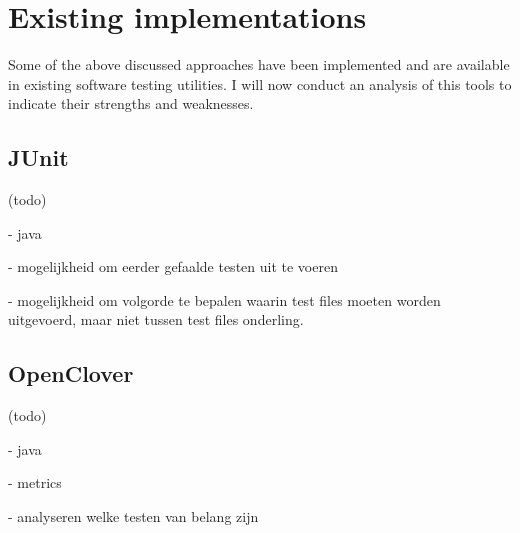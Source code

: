 
\section{Existing implementations}
Some of the above discussed approaches have been implemented and are available in existing software testing utilities. I will now conduct an analysis of this tools to indicate their strengths and weaknesses.

\subsection{JUnit}
(todo)

- java

- mogelijkheid om eerder gefaalde testen uit te voeren

- mogelijkheid om volgorde te bepalen waarin test files moeten worden uitgevoerd, maar niet tussen test files onderling.

\subsection{OpenClover}
(todo)

- java

- metrics

- analyseren welke testen van belang zijn